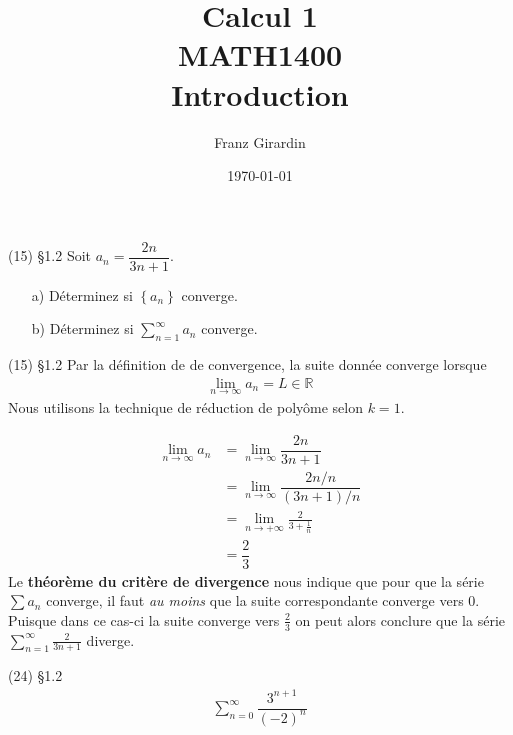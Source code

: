 \documentclass{report}
\title{\Huge{Calcul 1}\\{MATH1400}\\{\textbf{Introduction}}}
\author{\huge{Franz Girardin}}
\date{\today}
\begin{document}
\maketitle

\pagebreak

\pagebreak
\begin{multicols*}{3}


    \footnotesize

    \begin{Exercice}{(15) \S 1.2}
        Soit $a_n=\dfrac{2 n}{3 n+1}$.
        \begin{itemize}
            \item[a)] Déterminez si $\left\{ a_n \right\}$ converge.
            \item[b)] Déterminez si $\sum_{n=1}^{\infty } a_n$ converge. 
        \end{itemize}
    \end{Exercice}

    \begin{Reponse}{ (15) \S 1.2}
        Par la définition de de convergence, la suite donnée 
        converge lorsque 
        \begin{align*}
            \lim\limits_{n\to\infty  }a_n = L \in \mathbb{R} 
        \end{align*}
        Nous utilisons la technique de réduction de polyôme 
        selon $k = 1$. 

        \begin{align*}
            \lim\limits_{n\to\infty  }a_n &= 
             \lim\limits_{n\to\infty  }\dfrac{2n}{3n+1} \\ 
                                &= 
            \lim\limits_{n\to\infty  }\dfrac{2n/n}{(3n+1)/n} \\ 
                                &= 
            \lim\limits_{n\to+\infty }\frac{2}{3 + \frac{1}{n} }  \\ 
                                &=
            \dfrac{2}{3} 
        \end{align*}
        Le \textbf{théorème du critère de divergence} nous indique 
        que pour que la série $\sum a_n$ converge, il faut 
        \textit{au moins} que la suite correspondante converge vers 0. 
        Puisque dans ce cas-ci la suite converge vers $ \frac{2}{3} $
        on peut alors conclure que la série 
        $\sum_{n=1}^{\infty }\frac{2}{3n+1}$ diverge. 
        \end{Reponse}

        \begin{Exercice}{(24) \S 1.2}{}
            \begin{align*}
                \sum_{n=0}^{\infty }\dfrac{3^{n+1}}{(-2)^n} 
            \end{align*}
        \end{Exercice}


\end{multicols*}
\end{document}

